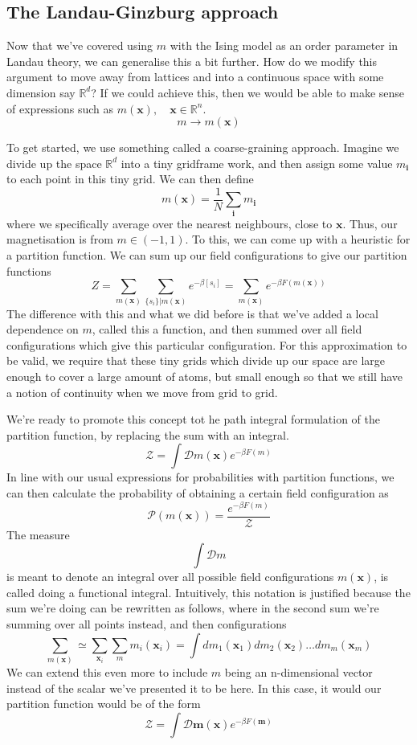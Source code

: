 \subsection{The Landau-Ginzburg approach} 
Now that we've covered using $m$ with the Ising model as an order parameter in Landau theory, we can generalise this a bit further. How do we modify this argument to move away from lattices and into a continuous space with some dimension say $\mathbb{R}^d$? If we could achieve this, then we would be able to make sense of expressions such as $m(\mathbf{x}), \quad \mathbf{x} \in \mathbb{R}^n$. 
\[ 
m \rightarrow m(\mathbf{x} ) 
\] 

To get started, we use something called a coarse-graining approach. Imagine we divide up the space $\mathbb{R}^d$ into a tiny gridframe work, and then assign some value $m_{\mathbf{i}}$ to each point in this tiny grid. We can then define 
\[
m(\mathbf{x}) = \frac{1}{N} \sum_{\mathbf{i}} m_\mathbf{i}
\] where we specifically average over the nearest neighbours, close to $\mathbf{x}$. Thus, our magnetisation is from $m \in ( -1, 1 )$. To this, we can come up with a heuristic for a partition function. We can sum up our field configurations to give our partition functions
\[ 
Z = \sum_{m ( \mathbf{x} )} \sum_{ \{ s_i \} | m ( \mathbf{x} ) } e^{  - \beta [ s_i ] }  = \sum_{ m ( \mathbf{x} )}  e^{ - \beta F ( m ( \mathbf{x} )) } 
\] The difference with this and what we did before is that we've added a local dependence on $m$, called this a function, and then summed over all field configurations which give this particular configuration. For this approximation to be valid, we require that these tiny grids which divide up our space are large enough to cover a large amount of atoms, but small enough so that we still have a notion of continuity when we move from grid to grid. 

We're ready to promote this concept tot he path integral formulation of the partition function, by replacing the sum with an integral. 
\[
\mathcal{Z} = \int \mathcal{D}m(\mathbf{x})e^{ - \beta F(m)}
\]
In line with our usual expressions for probabilities with partition functions, we can then calculate the probability of obtaining a certain field configuration as 
\[ 
\mathcal{P} ( m ( \mathbf{x} ) )  = \frac{ e^{  - \beta F( m ) } }{ \mathcal{Z} } 
\] 
The measure
\[
\int \mathcal{D}m 
\] is meant to denote an integral over all possible field configurations $m(\mathbf{x})$, is called doing a functional integral. Intuitively, this notation is justified because the sum we're doing can be rewritten as follows, where in the second sum we're summing over all points instead, and then configurations
\[ 
\sum_{ m ( \mathbf{x} )}   \simeq \sum_{ \mathbf{x}_i }  \sum_m m_i ( \mathbf{x}_i )  = \int dm_1( \mathbf{x}_1 ) dm_2 ( \mathbf{x}_2 ) \dots dm_m ( \mathbf{x}_m ) 
\] 
We can extend this even more to include $m$ being an n-dimensional vector instead of the scalar we've presented it to be here. In this case, it would our partition function would be of the form 
\[
\mathcal{Z} = \int \mathcal{D}  \mathbf{m}(\mathbf{x}) e^{ - \beta F(\mathbf{m})} 
\]

